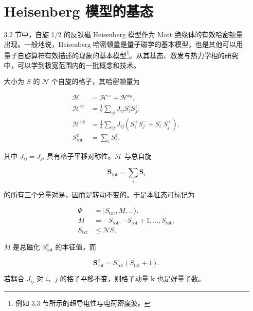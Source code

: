 \chapter{Heisenberg 模型的基态}

3.2 节中，自旋 1/2 的反铁磁 Heisenberg 模型作为 Mott 绝缘体的有效哈密顿量出现。一般地说，Heisenberg 哈密顿量是量子磁学的基本模型，也是其他可以用量子自旋算符有效描述的现象的基本模型\footnote{例如 3.3 节所示的超导电性与电荷密度波。}。从其基态、激发与热力学相的研究中，可以学到极宽范围内的一批概念和技术。

大小为 $S$ 的 $\mathcal{N}$ 个自旋的格子，其哈密顿量为

\begin{align*}
\mathcal {H} & = \mathcal {H} ^ {zz} + \mathcal {H} ^ {xy} ,\\
\mathcal {H} ^ {zz} & = \frac {1}{2} \sum_ {ij} J _ {ij} S _ {i} ^ {z} S _ {j} ^ {z} ,\\
\mathcal {H} ^ {xy} & = \frac {1}{4} \sum_ {ij} J _ {ij} \left( S _ {i} ^ {+} S _ {j} ^ {-} + S _ {i} ^ {-} S _ {j} ^ {+} \right) ,\\
S _ {\mathrm{tot}} ^ {z} & = \sum_ {i} S _ {i} ^ {z} ,
\tag{5.1}
\end{align*}

其中 $J_{ij} = J_{ji}$ 具有格子平移对称性。$\mathcal{H}$ 与总自旋

\begin{equation*}
\mathbf {S} _ {\mathrm{tot}} = \sum_ {i} \mathbf {S} _ {i}
\tag{5.2}
\end{equation*}

的所有三个分量对易，因而是转动不变的。于是本征态可标记为

\begin{align*}
\Psi & = | S _ {\mathrm{tot}}, M, \ldots \rangle ,\\
M & = - S _ {\mathrm{tot}}, - S _ {\mathrm{tot}} + 1, \ldots , S _ {\mathrm{tot}} ,\\
S _ {\mathrm{tot}} & \leq \mathcal {N} S ,
\tag{5.3}
\end{align*}

$M$ 是总磁化 $S_{\mathrm{tot}}^{z}$ 的本征值，而

\begin{equation*}
\mathbf {S} _ {\mathrm{tot}} ^ {2} = S _ {\mathrm{tot}} \left( S _ {\mathrm{tot}} + 1 \right).
\tag{5.4}
\end{equation*}

若耦合 $J_{ij}$ 对 $i$、$j$ 的格子平移不变，则格子动量 $\mathbf{k}$ 也是好量子数。

